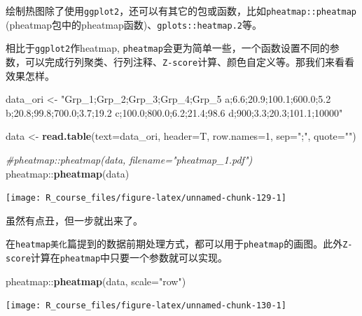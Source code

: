 \documentclass[]{article}
\newenvironment{Shaded}{\begin{snugshade}}{\end{snugshade}}
\newcommand{\KeywordTok}[1]{\textcolor[rgb]{0.13,0.29,0.53}{\textbf{{#1}}}}
\newcommand{\DataTypeTok}[1]{\textcolor[rgb]{0.13,0.29,0.53}{{#1}}}
\newcommand{\DecValTok}[1]{\textcolor[rgb]{0.00,0.00,0.81}{{#1}}}
\newcommand{\StringTok}[1]{\textcolor[rgb]{0.31,0.60,0.02}{{#1}}}
\newcommand{\CommentTok}[1]{\textcolor[rgb]{0.56,0.35,0.01}{\textit{{#1}}}}
\newcommand{\NormalTok}[1]{{#1}}
\numberwithin{figure}{section}
\numberwithin{table}{section}
\theoremstyle{definition}
\theoremstyle{definition}
\theoremstyle{definition}
\theoremstyle{remark}
\begin{document}
绘制热图除了使用\texttt{ggplot2}，还可以有其它的包或函数，比如\texttt{pheatmap::pheatmap}
(pheatmap包中的pheatmap函数)、\texttt{gplots::heatmap.2}等。

相比于\texttt{ggplot2}作heatmap,
\texttt{pheatmap}会更为简单一些，一个函数设置不同的参数，可以完成行列聚类、行列注释、\texttt{Z-score}计算、颜色自定义等。那我们来看看效果怎样。

\begin{Shaded}
\begin{Highlighting}[]
\NormalTok{data_ori <-}\StringTok{ "Grp_1;Grp_2;Grp_3;Grp_4;Grp_5}
\StringTok{a;6.6;20.9;100.1;600.0;5.2}
\StringTok{b;20.8;99.8;700.0;3.7;19.2}
\StringTok{c;100.0;800.0;6.2;21.4;98.6}
\StringTok{d;900;3.3;20.3;101.1;10000"}

\NormalTok{data <-}\StringTok{ }\KeywordTok{read.table}\NormalTok{(}\DataTypeTok{text=}\NormalTok{data_ori, }\DataTypeTok{header=}\NormalTok{T, }\DataTypeTok{row.names=}\DecValTok{1}\NormalTok{, }\DataTypeTok{sep=}\StringTok{";"}\NormalTok{, }\DataTypeTok{quote=}\StringTok{""}\NormalTok{)}
\end{Highlighting}
\end{Shaded}

\begin{Shaded}
\begin{Highlighting}[]
\CommentTok{#pheatmap::pheatmap(data, filename="pheatmap_1.pdf")}
\NormalTok{pheatmap::}\KeywordTok{pheatmap}\NormalTok{(data)}
\end{Highlighting}
\end{Shaded}

\begin{center}\texttt{[image: R\_course\_files/figure-latex/unnamed-chunk-129-1]} \end{center}

虽然有点丑，但一步就出来了。

在\texttt{heatmap美化}篇提到的数据前期处理方式，都可以用于\texttt{pheatmap}的画图。此外\texttt{Z-score}计算在\texttt{pheatmap}中只要一个参数就可以实现。

\begin{Shaded}
\begin{Highlighting}[]
\NormalTok{pheatmap::}\KeywordTok{pheatmap}\NormalTok{(data, }\DataTypeTok{scale=}\StringTok{"row"}\NormalTok{)}
\end{Highlighting}
\end{Shaded}

\begin{center}\texttt{[image: R\_course\_files/figure-latex/unnamed-chunk-130-1]} \end{center}
\end{document}

